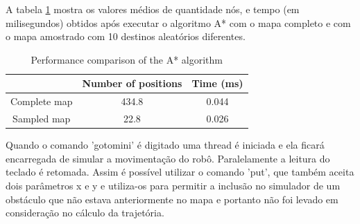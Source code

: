 \documentclass[eq,capa]{texufpel}
\begin{document}


A tabela \ref{table1} mostra os valores médios de quantidade nós, e tempo (em milisegundos) obtidos após executar o algoritmo A* com o mapa completo e com o mapa amostrado com 10 destinos aleatórios diferentes. 


\begin{table}[htbp]
\caption{Performance comparison of the A* algorithm}
\begin{center}
\begin{tabular}{ |c|c|c| } 
\hline
  & Number of positions & Time (ms) \\ 
 \hline
 Complete map & 434.8 & 0.044 \\ 
 \hline
 Sampled map & 22.8 & 0.026 \\ 
 \hline
\end{tabular}
\label{table1}
\end{center}
\end{table}

Quando o comando 'gotomini' é digitado uma thread é iniciada e ela ficará encarregada de simular a movimentação do robô. Paralelamente a leitura do teclado é retomada. Assim é possível utilizar o comando 'put', que também aceita dois parâmetros x e y e utiliza-os para permitir a inclusão no simulador de um obstáculo que não estava anteriormente no mapa e portanto não foi levado em consideração no cálculo da trajetória. 
\end{document}
